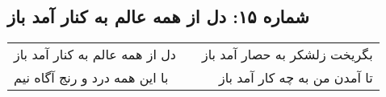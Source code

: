 \begin{center}
\section*{شماره ۱۵: دل از همه عالم به کنار آمد باز}
\label{sec:015}
\begin{longtable}{l p{0.5cm} r}
دل از همه عالم به کنار آمد باز
&&
بگریخت زلشکر به حصار آمد باز
\\
با این همه درد و رنج آگاه نیم
&&
تا آمدن من به چه کار آمد باز
\\
\end{longtable}
\end{center}

